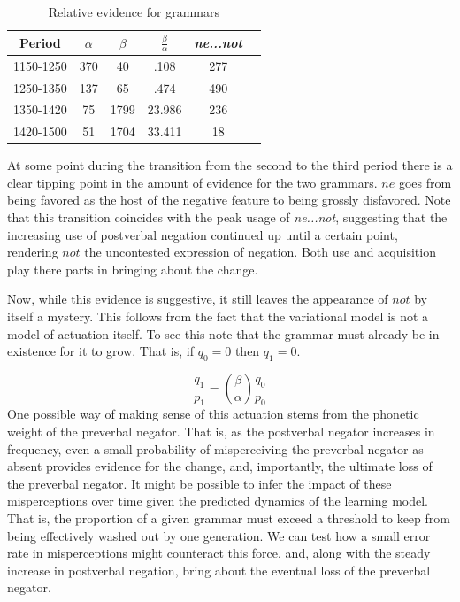 \documentclass[12pt]{article}
\theoremstyle{definition} \newtheorem{definition}{Definition}
\begin{document}
\begin{table}[ht]
\begin{center}
\begin{tabular}{@{}cccccc@{}}
\hline
Period & $\alpha$ & $\beta$ & $\frac{\beta}{\alpha}$ & \emph{ne...not}\\
\hline
1150-1250 & 370 & 40  & .108 & 277\\
1250-1350 & 137 & 65 & .474 & 490\\
1350-1420 & 75 & 1799 & 23.986 & 236\\
1420-1500 & 51 & 1704 & 33.411 & 18\\
\hline
\end{tabular}
  \caption{Relative evidence for grammars}
\label{evidence}
\end{center}
\end{table}

At some point during the transition from the second to the third period there is a clear tipping point in the amount of evidence for the two grammars. $ne$ goes from being favored as the host of the negative feature to being grossly disfavored. Note that this transition coincides with the peak usage of \emph{ne...not}, suggesting that the increasing use of postverbal negation continued up until a certain point, rendering $not$ the uncontested expression of negation. Both use and acquisition play there parts in bringing about the change.

Now, while this evidence is suggestive, it still leaves the appearance of $not$ by itself a mystery. This follows from the fact that the variational model is not a model of actuation itself. To see this note that the grammar must already be in existence for it to grow. That is, if $q_0 = 0$ then $q_1=0$.

\begin{equation}
     \frac{q_1}{p_1} = \left( \frac{\beta}{\alpha} \right)\frac{q_0}{p_0}
\end{equation}
One possible way of making sense of this actuation stems from the phonetic weight of the preverbal negator. That is, as the postverbal negator increases in frequency, even a small probability of misperceiving the preverbal negator as absent provides evidence for the change, and, importantly, the ultimate loss of the preverbal negator. It might be possible to infer the impact of these misperceptions over time given the predicted dynamics of the learning model. That is, the proportion of a given grammar must exceed a threshold to keep from being effectively washed out by one generation. We can test how a small error rate in misperceptions might counteract this force, and, along with the steady increase in postverbal negation, bring about the eventual loss of the preverbal negator. 
\end{document}
